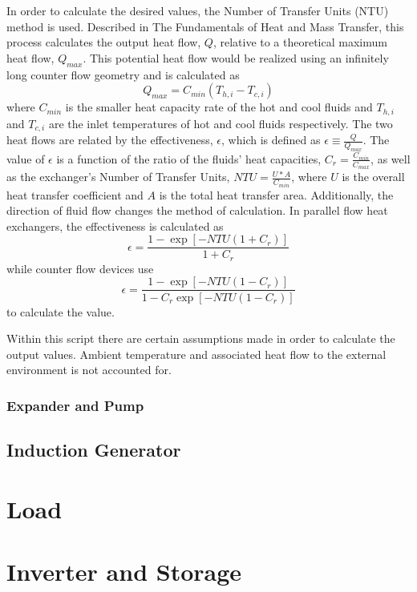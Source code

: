 In order to calculate the desired values, the Number of Transfer Units (NTU) method is used. Described in The Fundamentals of Heat and Mass Transfer, \cite{Incropera} this process calculates the output heat flow, $Q$, relative to a theoretical maximum heat flow, $Q_{max}$. This potential heat flow would be realized using an infinitely long counter flow geometry and is calculated as 
\begin{equation}
Q_{max} = C_{min}\left(T_{h,i} - T_{c,i}\right)
\end{equation}
where $C_{min}$ is the smaller heat capacity rate of the hot and cool fluids and $T_{h,i}$ and $T_{c,i}$ are the inlet temperatures of hot and cool fluids respectively. The two heat flows are related by the effectiveness, $\epsilon$, which is defined as $\epsilon \equiv \frac{Q}{Q_{max}}$. The value of $\epsilon$ is a function of the ratio of the fluids' heat capacities, $C_r = \frac{C_{min}}{C_{max}}$, as well as the exchanger's Number of Transfer Units, $NTU = \frac{U*A}{C_{min}}$, where $U$ is the overall heat transfer coefficient and $A$ is the total heat transfer area. Additionally, the direction of fluid flow changes the method of calculation. In parallel flow heat exchangers, the effectiveness is calculated as
\begin{equation}
\epsilon = \frac{1 - \exp\left[-NTU\left(1 + C_r\right)\right]}{1 + C_r}
\end{equation}
while counter flow devices use
\begin{equation}
\epsilon = \frac{1 - \exp\left[-NTU\left(1 - C_r\right)\right]}{1 - C_r\exp\left[-NTU\left(1 - C_r\right)\right]}
\end{equation}
to calculate the value.

Within this script there are certain assumptions made in order to calculate the output values. Ambient temperature and associated heat flow to the external environment is not accounted for.

\subsubsection{Expander and Pump}

\subsection{Induction Generator}

\section{Load}

\section{Inverter and Storage}